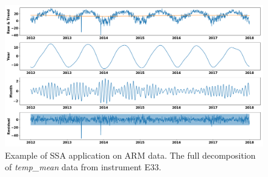 \begin{figure}[ht]
    \centering
    \includegraphics[width=\textwidth]{figures/E33.png}
    \caption{Example of SSA application on ARM data. The full decomposition of \textit{temp\_mean} data from instrument E33.}
    \label{fig:ssa}
\end{figure}

